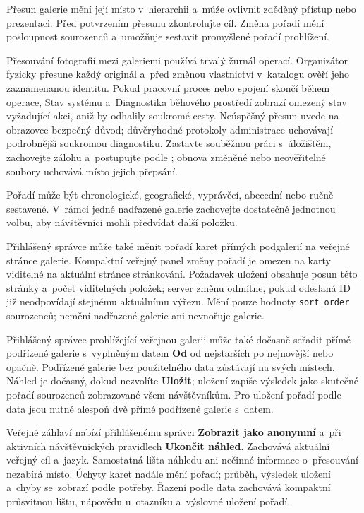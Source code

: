 \documentclass[11pt,a4paper]{article}
\newcommand{\filepath}[1]{\path{#1}}
\newcommand{\ui}[1]{\textbf{#1}}
\newcommand{\codeword}[1]{\nolinkurl{#1}}
\begin{document}
Přesun galerie mění její místo v~hierarchii a~může ovlivnit zděděný přístup nebo
prezentaci. Před potvrzením přesunu zkontrolujte cíl. Změna pořadí mění
posloupnost sourozenců a~umožňuje sestavit promyšlené pořadí prohlížení.

Přesouvání fotografií mezi galeriemi používá trvalý žurnál operací. Organizátor
fyzicky přesune každý originál a~před změnou vlastnictví v~katalogu ověří jeho
zaznamenanou identitu. Pokud pracovní proces nebo spojení skončí během operace,
Stav systému a~Diagnostika běhového prostředí zobrazí omezený stav vyžadující
akci, aniž by odhalily soukromé cesty. Neúspěšný přesun uvede na obrazovce
bezpečný důvod; důvěryhodné protokoly administrace uchovávají podrobnější
soukromou diagnostiku. Zastavte souběžnou práci s~úložištěm, zachovejte zálohu
a~postupujte podle \filepath{docs/IMAGE_MOVE_RECOVERY.md}; obnova změněné nebo
neověřitelné soubory uchovává místo jejich přepsání.

Pořadí může být chronologické, geografické, vyprávěcí, abecední nebo ručně
sestavené. V~rámci jedné nadřazené galerie zachovejte dostatečně jednotnou
volbu, aby návštěvníci mohli předvídat další položku.

Přihlášený správce může také měnit pořadí karet přímých podgalerií na veřejné
stránce galerie. Kompaktní veřejný panel změny pořadí je omezen na karty
viditelné na aktuální stránce stránkování. Požadavek uložení obsahuje posun této
stránky a~počet viditelných položek; server změnu odmítne, pokud odeslaná ID již
neodpovídají stejnému aktuálnímu výřezu. Mění pouze hodnoty
\codeword{sort_order} sourozenců; nemění nadřazené galerie ani nevnořuje
galerie.

Přihlášený správce prohlížející veřejnou galerii může také dočasně seřadit přímé
podřízené galerie s~vyplněným datem \ui{Od} od nejstarších po nejnovější nebo
opačně. Podřízené galerie bez použitelného data zůstávají na svých místech.
Náhled je dočasný, dokud nezvolíte \ui{Uložit}; uložení zapíše výsledek jako
skutečné pořadí sourozenců zobrazované všem návštěvníkům. Pro uložení pořadí
podle data jsou nutné alespoň dvě přímé podřízené galerie s~datem.

Veřejné záhlaví nabízí přihlášenému správci \ui{Zobrazit jako anonymní}
a~při aktivních návštěvnických pravidlech \ui{Ukončit náhled}. Zachovává
aktuální veřejný cíl a~jazyk. Samostatná lišta náhledu ani nečinné informace
o~přesouvání nezabírá místo. Úchyty karet nadále mění pořadí; průběh,
výsledek uložení a~chyby se~zobrazí podle potřeby. Řazení podle data zachovává
kompaktní průsvitnou lištu, nápovědu u~otazníku a~výslovné uložení pořadí.
\end{document}
